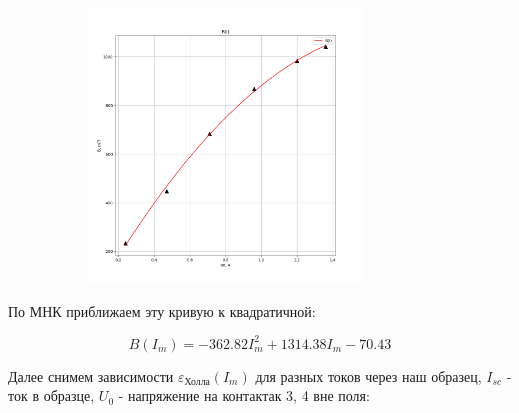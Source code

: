 \documentclass[a4paper, 12pt]{article}
\begin{document}
\begin{figure}[H]
    \centering
    \begin{subfigure}{0.8\textwidth}
        \centering
        \includegraphics[width=0.8\textwidth]{img/B(I).png}
    \end{subfigure}
\end{figure}

По МНК приближаем эту кривую к квадратичной:

\begin{equation}
    B(I_m) = -362.82I_m^2 + 1314.38I_m - 70.43
\end{equation}

\raggedright
Далее снимем зависимости $\varepsilon_\text{Холла}(I_m)$ для
разных токов через наш образец, $I_{sc}$ - ток в образце,
$U_0$ - напряжение на контактак 3, 4 вне поля:
\end{document}
